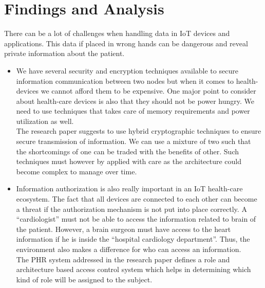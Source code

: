 \documentclass[letterpaper, 10 pt, conference]{ieeeconf}  %
\begin{document}
\section{Findings and Analysis}
There can be a lot of challenges when handling data in IoT devices and applications. This data if placed in wrong hands can be dangerous and reveal private information about the patient.
\begin{itemize}
\item We have several security and encryption techniques available to secure information communication between two nodes but when it comes to health-devices we cannot afford them to be expensive. One major point to consider about health-care devices is also that they should not be power hungry. We need to use techniques that takes care of memory requirements and power utilization as well.\\
The research paper\cite{three} suggests to use hybrid cryptographic techniques to ensure secure transmission of information. We can use a mixture of two such that the shortcomings of one can be traded with the benefits of other. Such techniques must however by applied with care as the architecture could become complex to manage over time.
\item Information authorization is also really important in an IoT health-care ecosystem. The fact that all devices are connected to each other can become a threat if the authorization mechanism is not put into place correctly. A ``cardiologist'' must not be able to access the information related to brain of the patient. However, a brain surgeon must have access to the heart information if he is inside the ``hospital cardiology department''. Thus, the environment also makes a difference for who can access an information.\\
The PHR system addressed in the research paper\cite{phr} defines a role and architecture based access control system which helps in determining which kind of role will be assigned to the subject.
\end{itemize}
\end{document}

